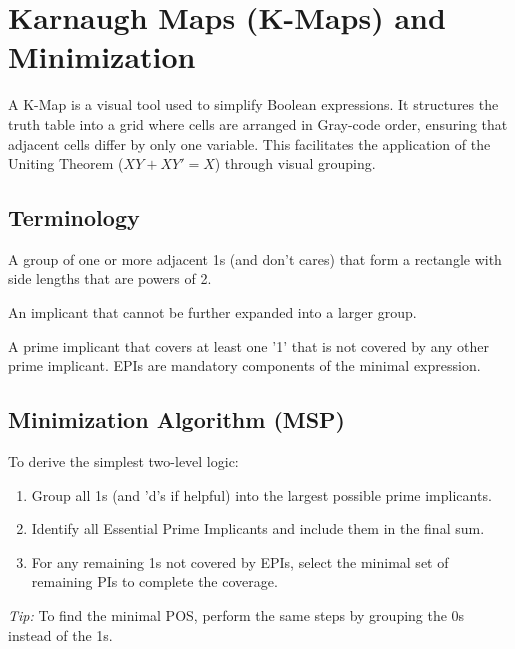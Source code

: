 \section{Karnaugh Maps (K-Maps) and Minimization}

\begin{definition}
A K-Map is a visual tool used to simplify Boolean expressions. It structures the truth table into a grid where cells are arranged in Gray-code order, ensuring that adjacent cells differ by only one variable. This facilitates the application of the Uniting Theorem ($XY + XY' = X$) through visual grouping.
\end{definition}

\subsection{Terminology}

\begin{vocabulary}[Implicant]
A group of one or more adjacent 1s (and don't cares) that form a rectangle with side lengths that are powers of 2.
\end{vocabulary}

\begin{vocabulary}
An implicant that cannot be further expanded into a larger group.
\end{vocabulary}

\begin{vocabulary}
A prime implicant that covers at least one '1' that is not covered by any other prime implicant. EPIs are mandatory components of the minimal expression.
\end{vocabulary}

\subsection{Minimization Algorithm (MSP)}

\begin{example}
To derive the simplest two-level logic:

\begin{enumerate}
    \item Group all 1s (and 'd's if helpful) into the largest possible prime implicants.
    \item Identify all Essential Prime Implicants and include them in the final sum.
    \item For any remaining 1s not covered by EPIs, select the minimal set of remaining PIs to complete the coverage.
\end{enumerate}

\textit{Tip:} To find the minimal POS, perform the same steps by grouping the 0s instead of the 1s.

\end{example}

